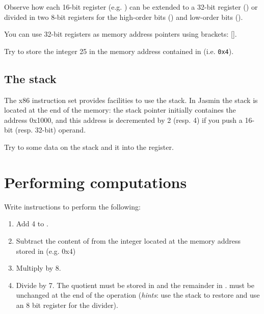 \documentclass{../../tp}
\begin{document}
Observe how each 16-bit register (e.g. ) can be extended to a 32-bit register () or divided in two 8-bit registers for the high-order bits () and low-order bits (). 

You can use 32-bit registers as memory address pointers using brackets: []. 

\begin{instruction}
	Try to store the integer 25 in the memory address contained in  (i.e. \texttt{0x4}).
\end{instruction}


\subsection{The stack}

The x86 instruction set provides facilities to use the stack. In \textsf{Jasmin} the stack is located at the end of the memory: the stack pointer initially containes the address 0x1000, and this address is decremented by 2 (resp. 4) if you push a 16-bit (resp. 32-bit) operand. 

\begin{instruction}
	Try to  some data on the stack and  it into the  register.
\end{instruction}


\section{Performing computations}


\begin{instruction}
	Write instructions to perform the following:
	\begin{enumerate}
		\item Add 4 to .
		\item Subtract the content of  from the integer located at the memory address stored in  (e.g. 0x4)
		\item Multiply  by 8.
		\item Divide  by 7. The quotient must be stored in  and the remainder in .
		 must be unchanged at the end of the operation 
		(\emph{hints}: use the stack to restore  and use an 8 bit register for the divider).
	\end{enumerate}
\end{instruction}
\end{document}
